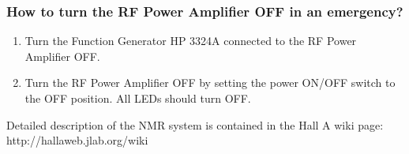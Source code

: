 {\subsubsection{How to turn the RF Power Amplifier OFF in an emergency?}
\begin{enumerate}
\item Turn the Function Generator HP 3324A connected to the RF Power 
  Amplifier OFF.
\item Turn the RF Power Amplifier OFF by setting the power ON/OFF 
  switch to the OFF position. 
  All LEDs should turn OFF.
\end{enumerate}

Detailed description of the NMR system is contained in the Hall A wiki
page:
http://hallaweb.jlab.org/wiki

} %

